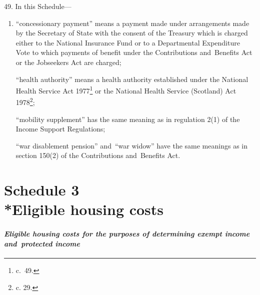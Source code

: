 \documentclass[12pt,a4paper]{article}
\begin{document}

\medskip

49.  In this Schedule—
\begin{enumerate}\item[]
“concessionary payment” means a payment made under arrangements made by the Secretary of State with the consent of the Treasury which is charged either to the National Insurance Fund or to a Departmental Expenditure Vote to which payments of benefit under the Contributions and~Benefits Act 
or the Jobseekers Act  %
are charged;

“health authority” means a health authority established under the National Health Service Act 1977\footnote{ c.~49.} or the National Health Service (Scotland) Act 1978\footnote{ c. 29.};

“mobility supplement” has the same meaning as in regulation 2(1) of the Income Support Regulations;

“war disablement pension” and~“war widow” have the same meanings as in section 150(2) of the Contributions and~Benefits Act.
\end{enumerate}


\part[Schedule 3 --- Eligible housing costs]{Schedule 3\\*Eligible housing costs}

\renewcommand\parthead{--- Schedule 3}

\subsection*{\itshape Eligible housing costs for the purposes of determining exempt income and~protected income}
\end{document}
